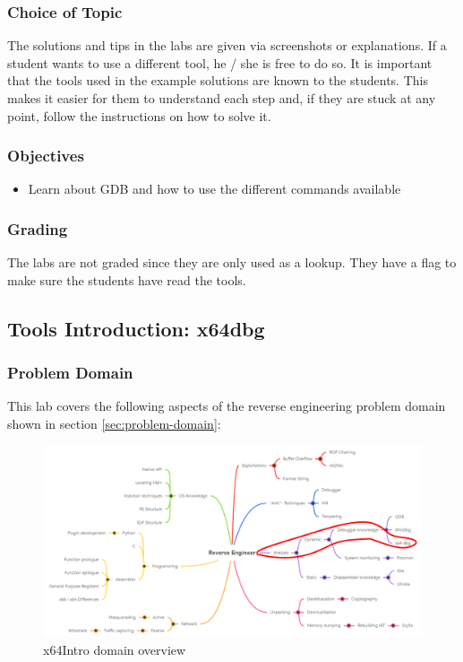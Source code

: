 \subsubsection*{Choice of Topic}
The solutions and tips in the labs are given via screenshots or explanations. If a student wants to use a different tool, he / she is free to do so. It is important that the tools used in the example solutions are known to the students. This makes it easier for them to understand each step and, if they are stuck at any point, follow the instructions on how to solve it. 
\subsubsection*{Objectives}
\begin{itemize}
    \item Learn about GDB and how to use the different commands available
\end{itemize}
\subsubsection*{Grading}
The labs are not graded since they are only used as a lookup. They have a flag to make sure the students have read the tools.
\pagebreak

\subsection{Tools Introduction: x64dbg}
\subsubsection*{Problem Domain}
This lab covers the following aspects of the reverse engineering problem domain shown in section \ref{sec:problem-domain}:
\vspace{-2ex}
\begin{figure}[H]
    \includegraphics[width=\textwidth]{resources/x64Intro-overview-light.png}
    \caption{x64Intro domain overview}
    \label{fig:x64Intro-overview}
\end{figure}
